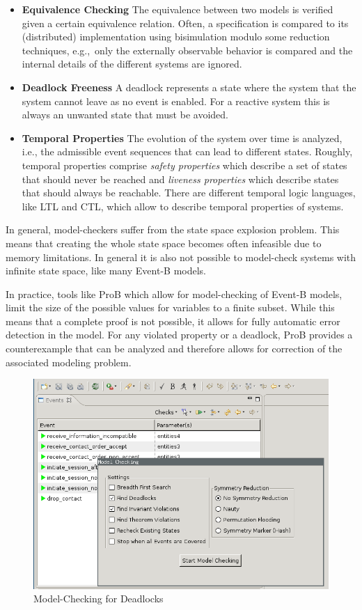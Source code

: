 \begin{itemize}
\item {\bf Equivalence Checking} The equivalence between two models is verified
  given a certain equivalence relation. Often, a specification is compared to
  its (distributed) implementation using bisimulation modulo some reduction
  techniques, e.g.,\ only the externally observable behavior is compared and the
  internal details of the different systems are ignored.
\item {\bf Deadlock Freeness} A deadlock represents a state where the system
  that the system cannot leave as no event is enabled. For a reactive system
  this is always an unwanted state that must be avoided.
\item {\bf Temporal Properties} The evolution of the system over time is
  analyzed, i.e., the admissible event sequences that can lead to different
  states. Roughly, temporal properties comprise \emph{safety properties} which
  describe a set of states that should never be reached and \emph{liveness
    properties} which describe states that should always be reachable. There are
  different temporal logic languages, like LTL and CTL, which allow to describe
  temporal properties of systems.
\end{itemize}

In general, model-checkers suffer from the state space explosion problem. This
means that creating the whole state space becomes often infeasible due to memory
limitations. In general it is also not possible to model-check systems with
infinite state space, like many Event-B models.

In practice, tools like ProB which allow for model-checking of Event-B models,
limit the size of the possible values for variables to a finite subset. While
this means that a complete proof is not possible, it allows for fully automatic
error detection in the model. For any violated property or a deadlock, ProB
provides a counterexample that can be analyzed and therefore allows for
correction of the associated modeling problem.

\begin{figure}[ht]
  \centering
  \includegraphics[width=.5\textwidth]{figures/ProBModelChecking}
  \caption{Model-Checking for Deadlocks}
  \label{fig:Prob-model-check}
\end{figure}

